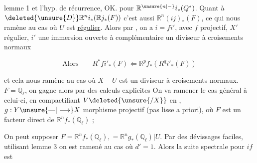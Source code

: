 
lemme 1 et l'hyp. de récurrence, OK. pour $\mathbb R^{\unsure{n|-}}i_*(Q^*)$. Quant à $\deleted{\unsure{D}}\mathbb R^ni_*(\mathbb R j_*(F))$ c'est aussi $\mathbb R^n(ij)_*(F)$, ce qui nous ramène au cas où $U$ est \uline{régulier}. Alors par , on a $i=fi'$, avec $f$ projectif, $X'$ régulier, $i'$ une immersion ouverte à complémentaire un diviseur à croisements normaux


\[ \text{Alors}\qquad R^*fi'_*(F)\Longleftarrow \mathbb R^p f_*(R^q i'_*(F)) \]

et cela nous ramène  au cas où  $X-U$ est un diviseur à croisements normaux.  $F=\mathbb Q_\ell$, on gagne alors par des calculs explicites  On va ramener le cas général à celui-ci, en compactifiant $V\deleted{\unsure{/X}}$ en , $g:Y\unsure{\text{---}|\longrightarrow}X$ morphisme projectif (pas lisse a priori), où $F$ est un facteur direct de $\mathbb R^nf_*(\mathbb Q_\ell)$ ; 


On peut supposer $F=\mathbb R^n f_*(\mathbb Q_\ell),=\mathbb R^n g_*(\mathbb Q_\ell)|U$. Par des dévissages faciles, utilisant lemme 3 on est ramené au cas où $d'=1$. Alors la suite spectrale pour $if$ est



